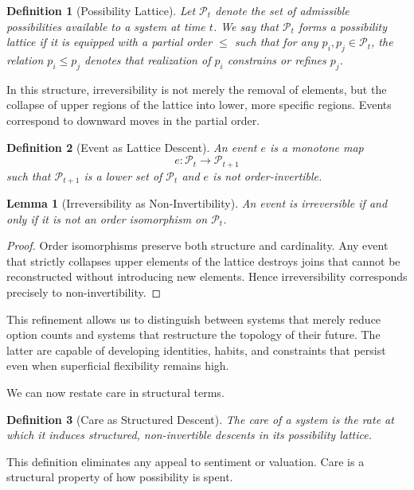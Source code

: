 \documentclass[11pt]{article}
\newtheorem{definition}{Definition}
\newtheorem{lemma}{Lemma}
\theoremstyle{remark}
\begin{document}
\begin{definition}[Possibility Lattice]
Let $\mathcal{P}_t$ denote the set of admissible possibilities available to a system at time $t$. We say that $\mathcal{P}_t$ forms a possibility lattice if it is equipped with a partial order $\leq$ such that for any $p_i, p_j \in \mathcal{P}_t$, the relation $p_i \leq p_j$ denotes that realization of $p_i$ constrains or refines $p_j$.
\end{definition}

In this structure, irreversibility is not merely the removal of elements, but the collapse of upper regions of the lattice into lower, more specific regions. Events correspond to downward moves in the partial order.

\begin{definition}[Event as Lattice Descent]
An event $e$ is a monotone map
\[
e : \mathcal{P}_t \rightarrow \mathcal{P}_{t+1}
\]
such that $\mathcal{P}_{t+1}$ is a lower set of $\mathcal{P}_t$ and $e$ is not order-invertible.
\end{definition}

\begin{lemma}[Irreversibility as Non-Invertibility]
An event is irreversible if and only if it is not an order isomorphism on $\mathcal{P}_t$.
\end{lemma}

\begin{proof}
Order isomorphisms preserve both structure and cardinality. Any event that strictly collapses upper elements of the lattice destroys joins that cannot be reconstructed without introducing new elements. Hence irreversibility corresponds precisely to non-invertibility.
\end{proof}

This refinement allows us to distinguish between systems that merely reduce option counts and systems that restructure the topology of their future. The latter are capable of developing identities, habits, and constraints that persist even when superficial flexibility remains high.

We can now restate care in structural terms.

\begin{definition}[Care as Structured Descent]
The care of a system is the rate at which it induces structured, non-invertible descents in its possibility lattice.
\end{definition}

This definition eliminates any appeal to sentiment or valuation. Care is a structural property of how possibility is spent.
\end{document}
